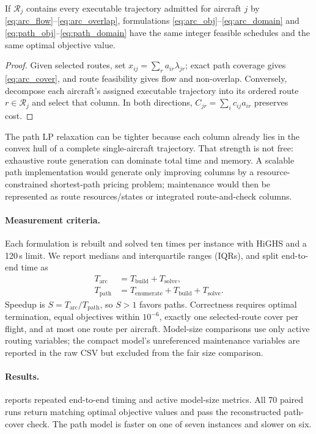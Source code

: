 \begin{proposition}
If $\mathcal R_j$ contains every executable trajectory admitted for aircraft
$j$ by \eqref{eq:arc_flow}--\eqref{eq:arc_overlap}, formulations
\eqref{eq:arc_obj}--\eqref{eq:arc_domain} and
\eqref{eq:path_obj}--\eqref{eq:path_domain} have the same integer feasible
schedules and the same optimal objective value.
\end{proposition}
\begin{proof}
Given selected routes, set $x_{ij}=\sum_r a_{ir}\lambda_{jr}$; exact path
coverage gives \eqref{eq:arc_cover}, and route feasibility gives flow and
non-overlap.  Conversely, decompose each aircraft's assigned executable
trajectory into its ordered route $r\in\mathcal R_j$ and select that column.
In both directions, $C_{jr}=\sum_i c_{ij}a_{ir}$ preserves cost.
\end{proof}

The path LP relaxation can be tighter because each column already lies in the
convex hull of a complete single-aircraft trajectory.  That strength is not
free: exhaustive route generation can dominate total time and memory.  A
scalable path implementation would generate only improving columns by a
resource-constrained shortest-path pricing problem; maintenance would then be
represented as route resources/states or integrated route-and-check columns.

\paragraph{Measurement criteria.}
Each formulation is rebuilt and solved ten times per instance with HiGHS and a
120\,s limit.  We report medians and interquartile ranges (IQRs), and split
end-to-end time as
\begin{align}
 T_{\mathrm{arc}}&=T_{\mathrm{build}}+T_{\mathrm{solve}},\\
 T_{\mathrm{path}}&=T_{\mathrm{enumerate}}+T_{\mathrm{build}}+T_{\mathrm{solve}}.
\end{align}
Speedup is $S=T_{\mathrm{arc}}/T_{\mathrm{path}}$, so $S>1$ favors paths.
Correctness requires optimal termination, equal objectives within $10^{-6}$,
exactly one selected-route cover per flight, and at most one route per
aircraft.  Model-size comparisons use only active routing variables; the
compact model's unreferenced maintenance variables are reported in the raw CSV
but excluded from the fair size comparison.

\paragraph{Results.}
 reports repeated end-to-end timing and active model-size
metrics.  All 70 paired runs return matching optimal objective values and pass
the reconstructed path-cover check.  The path model is faster on one of seven
instances and slower on six.

